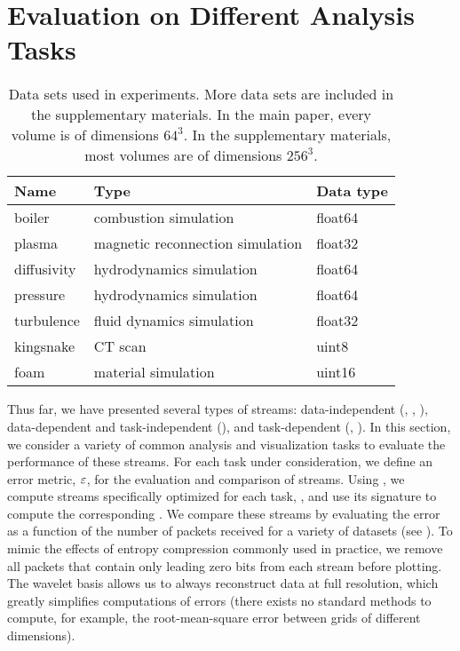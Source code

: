 \section{Evaluation on Different Analysis Tasks} \label{sec:analysis-tasks}

\begin{table}[t]
	\caption{Data sets used in experiments. More data sets are included in the
	supplementary materials. In the main paper, every volume is of dimensions $64^3$. In the 
	supplementary materials, most volumes are of dimensions $256^3$.}
  \centering
	\begin{tabular}{l l l}
  \toprule
  Name & Type & Data type \\
  \midrule
  boiler & combustion simulation& float64\\
  plasma & magnetic reconnection simulation& float32\\
  diffusivity & hydrodynamics simulation& float64\\
  pressure & hydrodynamics simulation& float64\\
	turbulence & fluid dynamics simulation& float32\\
	kingsnake & CT scan & uint8\\
	foam & material simulation & uint16\\
  \bottomrule
  \end{tabular}\label{tbl:data-sets}
\end{table}

Thus far, we have presented several types of streams: data-independent (\slvl, \sbit, \swav),
data-dependent and task-independent (\smag), and task-dependent (\sopt, \ssig). In this section, we
consider a variety of common analysis and visualization tasks to evaluate the performance of these
streams. For each task under consideration, we define an error metric, $\err$, for the evaluation
and comparison of streams. Using , we compute streams specifically optimized for
each task, \stkop, and use its signature to compute the corresponding \stksg. We compare these
streams by evaluating the error as a function of the number of packets received for a variety of
datasets (see ). To mimic the effects of entropy compression commonly used in
practice, we remove all packets that contain only leading zero bits from each stream before
plotting. The wavelet basis allows us to always reconstruct data at full resolution, which greatly
simplifies computations of errors (there exists no standard methods to compute, for example, the
root-mean-square error between grids of different dimensions).

